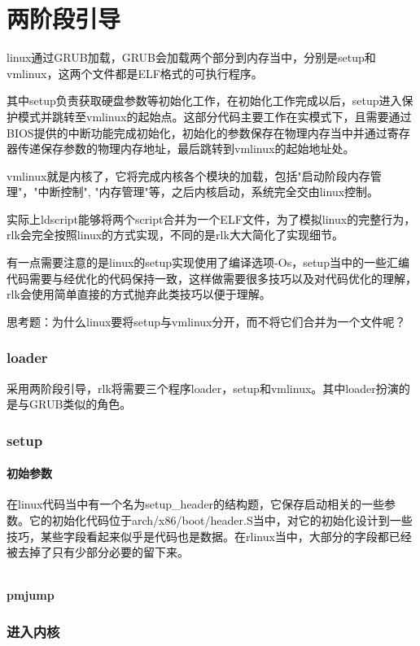 \chapter{两阶段引导}
linux通过GRUB加载，GRUB会加载两个部分到内存当中，分别是setup和vmlinux，这两个文件都是ELF格式的可执行程序。

其中setup负责获取硬盘参数等初始化工作，在初始化工作完成以后，setup进入保护模式并跳转至vmlinux的起始点。这部分代码主要工作在实模式下，且需要通过BIOS提供的中断功能完成初始化，初始化的参数保存在物理内存当中并通过寄存器传递保存参数的物理内存地址，最后跳转到vmlinux的起始地址处。

vmlinux就是内核了，它将完成内核各个模块的加载，包括"启动阶段内存管理"，"中断控制", "内存管理"等，之后内核启动，系统完全交由linux控制。

实际上ldscript能够将两个script合并为一个ELF文件，为了模拟linux的完整行为，rlk会完全按照linux的方式实现，不同的是rlk大大简化了实现细节。


有一点需要注意的是linux的setup实现使用了编译选项-Os，setup当中的一些汇编代码需要与经优化的代码保持一致，这样做需要很多技巧以及对代码优化的理解，rlk会使用简单直接的方式抛弃此类技巧以便于理解。

思考题：为什么linux要将setup与vmlinux分开，而不将它们合并为一个文件呢？

\subsection{loader}
采用两阶段引导，rlk将需要三个程序loader，setup和vmlinux。其中loader扮演的是与GRUB类似的角色。

\subsection{setup}
\subsubsection{初始参数}

在linux代码当中有一个名为setup\_header的结构题，它保存启动相关的一些参数。它的初始化代码位于arch/x86/boot/header.S当中，对它的初始化设计到一些技巧，某些字段看起来似乎是代码也是数据。在rlinux当中，大部分的字段都已经被去掉了只有少部分必要的留下来。
\begin{lstlisting}
\end{lstlisting}

\subsubsection{pmjump}
\subsection{进入内核}


